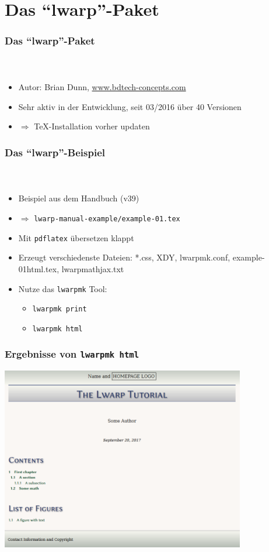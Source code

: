 \documentclass[12pt,ngerman]{beamer}
\begin{document}
\section{Das \enquote{lwarp}-Paket}

\begin{frame}
\frametitle{Das \enquote{lwarp}-Paket}
\framesubtitle{~}

\begin{itemize}
\item Autor: Brian Dunn, \url{www.bdtech-concepts.com}
\item Sehr aktiv in der Entwicklung, seit 03/2016 über 40 Versionen
\item $\Rightarrow$ \TeX-Installation vorher updaten
\end{itemize}

\end{frame}

\begin{frame}
\frametitle{Das \enquote{lwarp}-Beispiel}
\framesubtitle{~}

\begin{itemize}
\item Beispiel aus dem Handbuch (v39)
\item $\Rightarrow$ \texttt{lwarp-manual-example/example-01.tex}
\item Mit \texttt{pdflatex} übersetzen klappt 
\item Erzeugt verschiedenste Dateien: *.css, XDY, lwarpmk.conf, example-01\textunderscore html.tex, lwarp\textunderscore  mathjax.txt
\item Nutze das \texttt{lwarpmk} Tool:
\begin{itemize}
	\item \texttt{lwarpmk print}
	\item \texttt{lwarpmk html}
	\end{itemize}
\end{itemize}
\end{frame}

\begin{frame}
\frametitle{Ergebnisse von \texttt{lwarpmk html}}

\begin{center}
\includegraphics[width=0.8\textwidth]{lwarp-manual-example/bild-01.png}
\end{center}

\end{frame}
\end{document}
